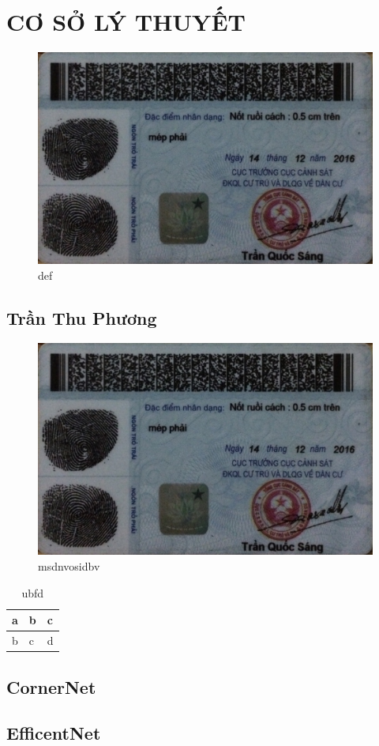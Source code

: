 

\section{CƠ SỞ LÝ THUYẾT}

\begin{figure}[h]
\centering
\includegraphics[scale=0.2]{figure/1.jpg}
\caption{def}
\end{figure}
\pagebreak

\subsection{Trần Thu Phương}

\begin{figure}[h]
\centering
\includegraphics[scale=0.4]{figure/1.jpg}
\caption{msdnvosidbv}
\end{figure}

\begin{table}[h]
\centering
\begin{tabular}{|l|l|l|}
\hline
a&b&c\\
\hline
b&c&d\\
\hline
\end{tabular}
\caption{ubfd}
\end{table}
\pagebreak
\subsection{CornerNet}
\subsection{EfficentNet}